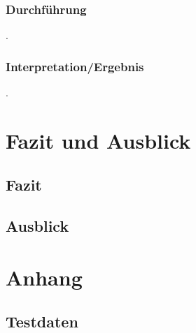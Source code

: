 \documentclass[12pt,a4paper]{report}
\begin{document}
		\subsection{Durchführung}
		.
		\subsection{Interpretation/Ergebnis}
		.
		

\newpage
\chapter{Fazit und Ausblick}
\section{Fazit}

\newpage
\section{Ausblick}
\newpage
\chapter{Anhang}
	\section{Testdaten}
	\label{sec:Testdaten}
\end{document}
